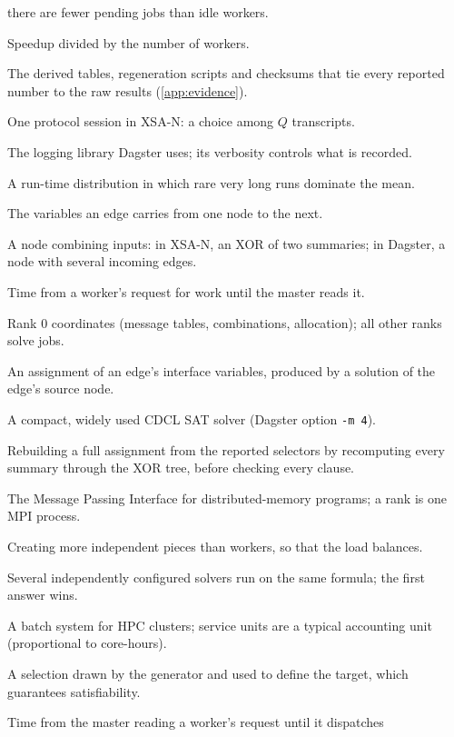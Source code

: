 \documentclass[11pt,a4paper]{article}
\newcommand{\XSA}{\textsf{XSA-N}}
\newcommand{\opt}[1]{\texttt{#1}}
\begin{document}
\begin{description}[style=nextline, leftmargin=1.5em, font=\normalfont\bfseries]
  there are fewer pending jobs than idle workers.
\item[Efficiency] Speedup divided by the number of workers.
\item[Evidence archive] The derived tables, regeneration scripts and checksums that tie every
  reported number to the raw results (\cref{app:evidence}).
\item[Episode] One protocol session in \XSA{}: a choice among $Q$ transcripts.
\item[glog] The logging library Dagster uses; its verbosity controls what is recorded.
\item[Heavy tail] A run-time distribution in which rare very long runs dominate the mean.
\item[Interface variables] The variables an edge carries from one node to the next.
\item[Join] A node combining inputs: in \XSA{}, an XOR of two summaries; in Dagster, a node
  with several incoming edges.
\item[Lag] Time from a worker's request for work until the master reads it.
\item[Master / worker] Rank 0 coordinates (message tables, combinations, allocation); all
  other ranks solve jobs.
\item[Message] An assignment of an edge's interface variables, produced by a solution of
  the edge's source node.
\item[MiniSat] A compact, widely used CDCL SAT solver (Dagster option \opt{-m 4}).
\item[Model completion] Rebuilding a full assignment from the reported selectors by
  recomputing every summary through the XOR tree, before checking every clause.
\item[MPI / rank] The Message Passing Interface for distributed-memory programs; a rank is
  one MPI process.
\item[Over-decomposition] Creating more independent pieces than workers, so that the load
  balances.
\item[Portfolio] Several independently configured solvers run on the same formula; the first
  answer wins.
\item[PBS / SU] A batch system for HPC clusters; service units are a typical accounting unit
  (proportional to core-hours).
\item[Planted solution] A selection drawn by the generator and used to define the target,
  which guarantees satisfiability.
\item[Response time] Time from the master reading a worker's request until it dispatches

\end{description}
\end{document}
